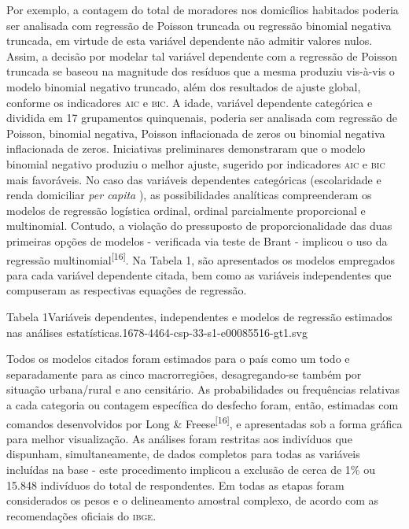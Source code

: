 \documentclass{article}
\begin{document}
Por exemplo, a contagem do total de moradores nos domicílios habitados poderia
ser analisada com regressão de Poisson truncada ou regressão binomial negativa
truncada, em virtude de esta variável dependente não admitir valores nulos.
Assim, a decisão por modelar tal variável dependente com a regressão de Poisson
truncada se baseou na magnitude dos resíduos que a mesma produziu vis-à-vis o
modelo binomial negativo truncado, além dos resultados de ajuste global,
conforme os indicadores \textsc{aic} e \textsc{bic}. A idade, variável dependente categórica e
dividida em 17 grupamentos quinquenais, poderia ser analisada com regressão de
Poisson, binomial negativa, Poisson inflacionada de zeros ou binomial negativa
inflacionada de zeros. Iniciativas preliminares demonstraram que o modelo
binomial negativo produziu o melhor ajuste, sugerido por indicadores \textsc{aic} e \textsc{bic}
mais favoráveis. No caso das variáveis dependentes categóricas (escolaridade e
renda domiciliar \textit{per capita}
), as possibilidades analíticas compreenderam os modelos de regressão logística
ordinal, ordinal parcialmente proporcional e multinomial. Contudo, a violação do
pressuposto de proporcionalidade das duas primeiras opções de modelos -
verificada via teste de Brant - implicou o uso da regressão multinomial\textsuperscript{[}\textsuperscript{16}\textsuperscript{]}. Na Tabela 1, são apresentados os modelos empregados para cada variável
dependente citada, bem como as variáveis independentes que compuseram as
respectivas equações de regressão.

Tabela 1Variáveis dependentes, independentes e modelos de regressão estimados
nas análises estatísticas.1678-4464-csp-33-s1-e00085516-gt1.svg

Todos os modelos citados foram estimados para o país como um todo e
separadamente para as cinco macrorregiões, desagregando-se também por situação
urbana/rural e ano censitário. As probabilidades ou frequências relativas a cada
categoria ou contagem específica do desfecho foram, então, estimadas com
comandos desenvolvidos por Long \& Freese\textsuperscript{[}\textsuperscript{16}\textsuperscript{]}, e apresentadas sob a forma gráfica para melhor visualização. As análises foram
restritas aos indivíduos que dispunham, simultaneamente, de dados completos para
todas as variáveis incluídas na base - este procedimento implicou a exclusão de
cerca de 1\% ou 15.848 indivíduos do total de respondentes. Em todas as etapas
foram considerados os pesos e o delineamento amostral complexo, de acordo com as
recomendações oficiais do \textsc{ibge}.
\end{document}
